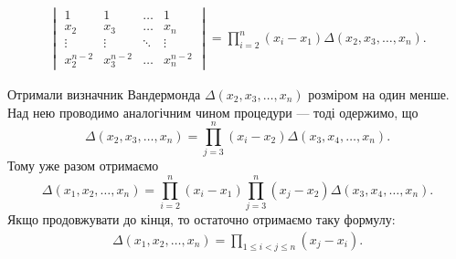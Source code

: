 \documentclass{math_library}
\begin{document}
\begin{example}
\begin{multline*}
\begin{vmatrix}
1 & 1 & \dots & 1 \\
x_2 & x_3 & \dots & x_n \\
\vdots & \vdots & \ddots & \vdots \\
x_2^{n-2} & x_3^{n-2} & \dots & x_n^{n-2}
\end{vmatrix} = \displaystyle\prod_{i=2}^n (x_i-x_1) \Delta (x_2,x_3,\dots,x_n).
\end{multline*}

Отримали визначник Вандермонда $\Delta (x_2,x_3,\dots,x_n)$ розміром на один менше. Над нею проводимо аналогічним чином процедури --- тоді одержимо, що 
\[
\Delta (x_2,x_3,\dots,x_n) = \displaystyle\prod_{j=3}^n (x_i-x_2) \Delta (x_3,x_4,\dots,x_n).
\]
Тому уже разом отримаємо 
\[
\Delta (x_1,x_2,\dots,x_n) = \displaystyle\prod_{i=2}^n (x_i-x_1) \prod_{j=3}^n (x_j-x_2) \Delta (x_3,x_4,\dots,x_n).
\]
Якщо продовжувати до кінця, то остаточно отримаємо таку формулу:
\begin{align*}
\Delta (x_1,x_2,\dots,x_n) = \displaystyle\prod_{1 \leq i<j \leq n} (x_j-x_i).
\end{align*}
\end{example}
\end{document}
